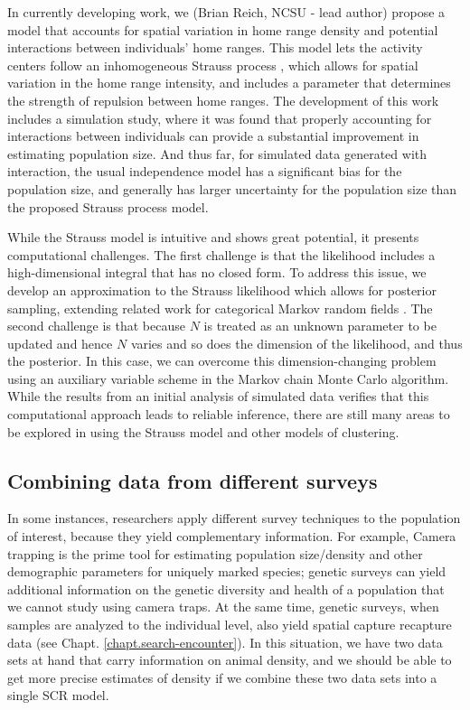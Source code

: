 In currently developing work, we (Brian Reich, NCSU - lead author) propose a model that accounts for
spatial variation in home range density and potential interactions
between individuals' home ranges.  This model lets the activity
centers follow an inhomogeneous Strauss process
\citep{strauss:1975}, which allows for spatial variation
in the home range intensity, and includes a parameter that determines
the strength of repulsion between home ranges. 
The development of this work includes a simulation study, 
where it was found that properly accounting for interactions between
individuals can provide a substantial improvement in estimating
population size.  And thus far, for simulated data generated with interaction, the
usual independence model has a significant bias for the population
size, and generally has larger uncertainty for the population size
than the proposed Strauss process model.

While the Strauss model is intuitive and shows great potential, it
presents computational challenges.  The first challenge is that 
the likelihood includes a
high-dimensional integral that has no closed form.  To address this
issue, we develop an approximation to the
Strauss likelihood which allows for posterior sampling, extending related
work for categorical Markov random fields
\citep{green_richardson:2002,smith_smith:2006}.  The second challenge is that 
because $N$ is treated as an unknown
parameter to be updated and hence $N$
varies and so does the dimension of the likelihood, and thus the
posterior.  In this case, we can overcome this dimension-changing problem using an
auxiliary variable scheme in the Markov chain Monte Carlo algorithm.
While the results from an initial analysis of simulated data verifies that this computational
approach leads to reliable inference, there are still many areas to be explored in
using the Strauss model and other models of clustering.


\subsection{Combining data from different surveys}

In some instances, researchers apply different survey techniques to
the population of interest, because they yield complementary
information. For example, Camera trapping is the prime tool for
estimating population size/density and other demographic parameters
for uniquely marked species; genetic surveys can yield additional
information on the genetic diversity and health of a population that
we cannot study using camera traps. At the same time, genetic surveys,
when samples are analyzed to the individual level, also yield spatial
capture recapture data (see Chapt. \ref{chapt.search-encounter}). In
this situation, we have two data sets at hand that carry information
on animal density, and we should be able to get more precise estimates
of density if we combine these two data sets into a single SCR model.

